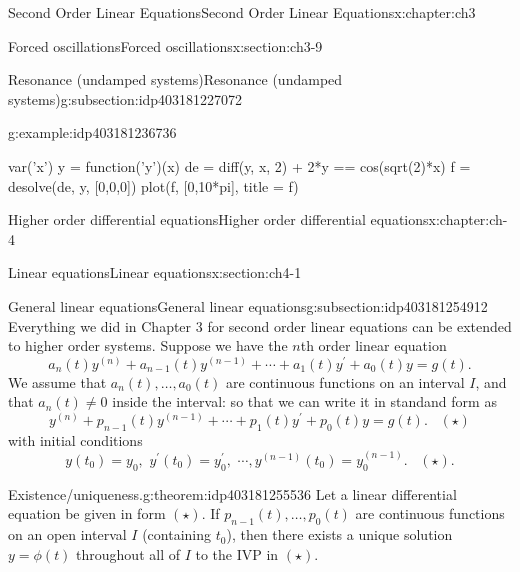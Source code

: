 \documentclass[oneside,10pt,]{book}
\numberwithin{equation}{section}
\numberwithin{equation}{section}
\begin{document}
\begin{chapterptx}{Second Order Linear Equations}{}{Second Order Linear Equations}{}{}{x:chapter:ch3}
\begin{sectionptx}{Forced oscillations}{}{Forced oscillations}{}{}{x:section:ch3-9}
\begin{subsectionptx}{Resonance (undamped systems)}{}{Resonance (undamped systems)}{}{}{g:subsection:idp403181227072}
\begin{example}{}{g:example:idp403181236736}
\begin{sageinput}
var('x')
y = function('y')(x)
de = diff(y, x, 2) + 2*y == cos(sqrt(2)*x)
f = desolve(de, y, [0,0,0])
plot(f, [0,10*pi], title = f)
\end{sageinput}
\end{example}
\end{subsectionptx}
\end{sectionptx}
\end{chapterptx}
%
%
\typeout{************************************************}
\typeout{************************************************}
%
\begin{chapterptx}{Higher order differential equations}{}{Higher order differential equations}{}{}{x:chapter:ch-4}
%
%
\typeout{************************************************}
\typeout{************************************************}
%
\begin{sectionptx}{Linear equations}{}{Linear equations}{}{}{x:section:ch4-1}
%
%
\typeout{************************************************}
\typeout{************************************************}
%
\begin{subsectionptx}{General linear equations}{}{General linear equations}{}{}{g:subsection:idp403181254912}
Everything we did in Chapter 3 for second order linear equations can be extended to higher order systems. Suppose we have the \(n\)th order linear equation%
\begin{equation*}
a_{n}(t)y^{(n)}+a_{n-1}(t)y^{(n-1)}+\cdots+a_{1}(t)y^{\prime}+a_{0}(t)y=g(t).
\end{equation*}
We assume that \(a_{n}(t),\dots,a_{0}(t)\) are continuous functions on an interval \(I\), and that \(a_{n}(t)\neq0\) inside the interval: so that we can write it in standand form as%
\begin{equation*}
y^{(n)}+p_{n-1}(t)y^{(n-1)}+\cdots+p_{1}(t)y^{\prime}+p_{0}(t)y=g(t).\,\,\,\,\,(\star)
\end{equation*}
with initial conditions%
\begin{equation*}
y(t_{0})=y_{0},\,\,y^{\prime}(t_{0})=y_{0}^{\prime},\,\,\cdots,y^{(n-1)}(t_{0})=y_{0}^{(n-1)}.\,\,\,\,\,(\star)\text{.}
\end{equation*}
%
\begin{theorem}{Existence\slash{}uniqueness.}{}{g:theorem:idp403181255536}%
Let a linear differential equation be given in form \((\star)\). If \(p_{n-1}(t),\dots,p_{0}(t)\) are continuous functions on an open interval \(I\) (containing \(t_{0}\)), then there exists a unique solution \(y=\phi(t)\) throughout all of \(I\) to the IVP in \((\star)\).%

\end{theorem}
\end{subsectionptx}
\end{sectionptx}
\end{chapterptx}
\end{document}
